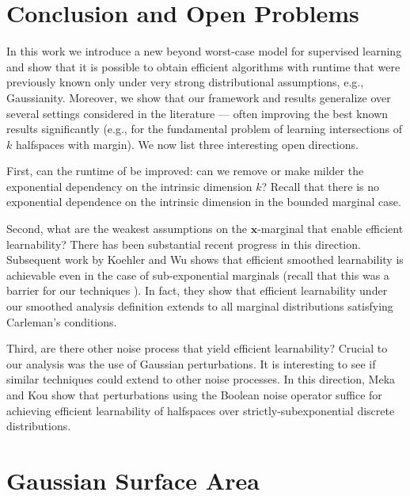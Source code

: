 \documentclass[10pt,a4paper]{article}
\renewcommand\vec[1]{\mathbf{#1}}
\newcommand{\1}{\Ind}
\newcommand{\x}{\vec x}
\begin{document}
\section{Conclusion and Open Problems}
In this work we introduce a new beyond worst-case model for supervised learning and show that it is possible
to obtain efficient algorithms with runtime that were previously known only under very strong distributional assumptions, e.g., Gaussianity.  Moreover, we show that our framework and results generalize over several
settings considered in the literature --- often improving the best known results significantly (e.g., 
for the fundamental problem of learning intersections of $k$ halfspaces with margin). We now list three interesting open directions. 

First, can the runtime 
of  be improved: can we remove or make milder the exponential dependency on the intrinsic dimension $k$? Recall that there is no exponential dependence on the intrinsic dimension in the bounded marginal case. 

Second, what are the weakest assumptions on the $\x$-marginal that enable efficient learnability? There has been substantial recent progress in this direction. Subsequent work by Koehler and Wu \cite{koehler2025constructive} shows that efficient smoothed learnability is achievable even in the case of sub-exponential marginals (recall that this was a barrier for our techniques ). In fact, they show that efficient learnability under our smoothed analysis definition extends to all marginal distributions satisfying Carleman's conditions.

Third, are there other noise process that yield efficient learnability? Crucial to our analysis was the use of Gaussian perturbations. It is interesting to see if similar techniques could extend to other noise processes. In this direction, Meka and Kou \cite{kou2025smoothed} show that perturbations using the Boolean noise operator suffice for achieving efficient learnability of halfspaces over strictly-subexponential discrete distributions. 


%
%




\newpage
\appendix

\section{Gaussian Surface Area}
\end{document}
